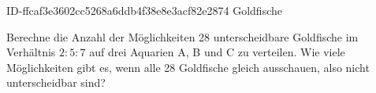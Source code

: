 \begin{exercise}
      {ID-ffcaf3e3602cc5268a6ddb4f38e8e3acf82e2874}
      {Goldfische}
  \ifproblem\problem\par
    Berechne die Anzahl der Möglichkeiten 28 unterscheidbare Goldfische im
    Verhältnis $2:5:7$ auf drei Aquarien A, B und C zu verteilen. Wie viele
    Möglichkeiten gibt es, wenn alle 28 Goldfische gleich ausschauen, also
    nicht unterscheidbar sind?
  \fi
\end{exercise}

